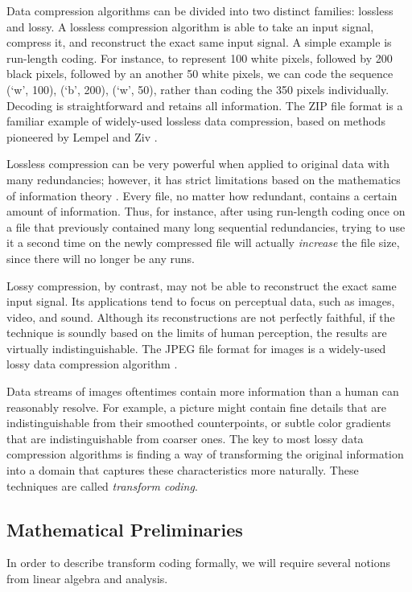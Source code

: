 Data compression algorithms can be divided into two distinct families: lossless and lossy. A lossless compression algorithm is able to take an input signal, compress it, and reconstruct the exact same input signal. A simple example is run-length coding. For instance, to represent 100 white pixels, followed by 200 black pixels, followed by an another 50 white pixels, we can code the sequence (`w', 100), (`b', 200), (`w', 50), rather than coding the 350 pixels individually. Decoding is straightforward and retains all information. The ZIP file format is a familiar example of widely-used lossless data compression, based on methods pioneered by Lempel and Ziv \cite{ziv1977universal}.

Lossless compression can be very powerful when applied to original data with many redundancies; however, it has strict limitations based on the mathematics of information theory \cite{shannon1998mathematical}. Every file, no matter how redundant, contains a certain amount of information. Thus, for instance, after using run-length coding once on a file that previously contained many long sequential redundancies, trying to use it a second time on the newly compressed file will actually {\em increase} the file size, since there will no longer be any runs.

Lossy compression, by contrast, may not be able to reconstruct the exact same input signal. Its applications tend to focus on perceptual data, such as images, video, and sound. Although its reconstructions are not perfectly faithful, if the technique is soundly based on the limits of human perception, the results are virtually indistinguishable. The JPEG file format for images is a widely-used lossy data compression algorithm \cite{wallace1992jpeg}.

Data streams of images oftentimes contain more information than a human can reasonably resolve. For example, a picture might contain fine details that are indistinguishable from their smoothed counterpoints, or subtle color gradients that are indistinguishable from coarser ones. The key to most lossy data compression algorithms is finding a way of transforming the original information into a domain that captures these characteristics more naturally. These techniques are called {\em transform coding}.

\subsection{Mathematical Preliminaries}
In order to describe transform coding formally, we will require several notions from linear algebra and analysis.
